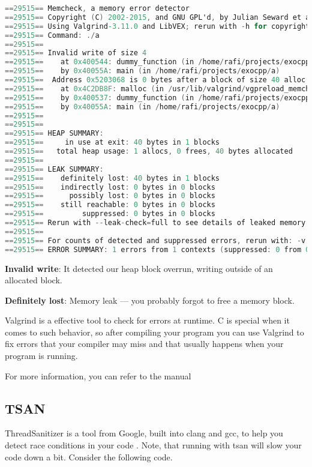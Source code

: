 \begin{lstlisting}[language=C]
==29515== Memcheck, a memory error detector
==29515== Copyright (C) 2002-2015, and GNU GPL'd, by Julian Seward et al.
==29515== Using Valgrind-3.11.0 and LibVEX; rerun with -h for copyright info
==29515== Command: ./a
==29515==
==29515== Invalid write of size 4
==29515==    at 0x400544: dummy_function (in /home/rafi/projects/exocpp/a)
==29515==    by 0x40055A: main (in /home/rafi/projects/exocpp/a)
==29515==  Address 0x5203068 is 0 bytes after a block of size 40 alloc'd
==29515==    at 0x4C2DB8F: malloc (in /usr/lib/valgrind/vgpreload_memcheck-amd64-linux.so)
==29515==    by 0x400537: dummy_function (in /home/rafi/projects/exocpp/a)
==29515==    by 0x40055A: main (in /home/rafi/projects/exocpp/a)
==29515==
==29515==
==29515== HEAP SUMMARY:
==29515==     in use at exit: 40 bytes in 1 blocks
==29515==   total heap usage: 1 allocs, 0 frees, 40 bytes allocated
==29515==
==29515== LEAK SUMMARY:
==29515==    definitely lost: 40 bytes in 1 blocks
==29515==    indirectly lost: 0 bytes in 0 blocks
==29515==      possibly lost: 0 bytes in 0 blocks
==29515==    still reachable: 0 bytes in 0 blocks
==29515==         suppressed: 0 bytes in 0 blocks
==29515== Rerun with --leak-check=full to see details of leaked memory
==29515==
==29515== For counts of detected and suppressed errors, rerun with: -v
==29515== ERROR SUMMARY: 1 errors from 1 contexts (suppressed: 0 from 0)
\end{lstlisting}

\textbf{Invalid write}: It detected our heap block overrun, writing outside of an allocated block.

\textbf{Definitely lost}: Memory leak --- you probably forgot to free a memory block.

Valgrind is a effective tool to check for errors at runtime. C is special when it comes to such behavior, so after compiling your program you can use Valgrind to fix errors that your compiler may miss and that usually happens when your program is running.

For more information, you can refer to the manual \cite{valgrind}

\subsection{TSAN}

ThreadSanitizer is a tool from Google, built into clang and gcc, to help you detect race conditions in your code \cite{threadsanitizercppmanual_2018}.
Note, that running with tsan will slow your code down a bit. Consider the following code.

